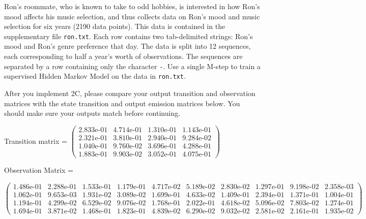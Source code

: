 Ron's roommate, who is known to take to odd hobbies, is interested in how Ron's mood affects his music selection, and thus collects data on Ron's mood and music selection for six years (2190 data points). This data is contained in the supplementary file \texttt{ron.txt}. Each row contains two tab-delimited strings: Ron's mood and Ron's genre preference that day. The data is split into 12 sequences, each corresponding to half a year's worth of observations. The sequences are separated by a row containing only the character \texttt{-}.
\noindent\problem[10] %
Use a single M-step to train a supervised Hidden Markov Model on the data in \texttt{ron.txt}.

After you implement 2C, please compare your output transition and observation matrices with the state transition and output emission matrices below. You should make sure your outputs match before continuing.

Transition matrix = \small $\begin{pmatrix}
    2.833\text{e-}01 & 4.714\text{e-}01 & 1.310\text{e-}01 & 1.143\text{e-}01 \\
    2.321\text{e-}01 & 3.810\text{e-}01 & 2.940\text{e-}01 & 9.284\text{e-}02 \\
    1.040\text{e-}01 & 9.760\text{e-}02 & 3.696\text{e-}01 & 4.288\text{e-}01 \\
    1.883\text{e-}01 & 9.903\text{e-}02 & 3.052\text{e-}01 & 4.075\text{e-}01 
\end{pmatrix}$
\normalsize

Observation Matrix =

\small
$\begin{pmatrix}
1.486\text{e-}01 & 2.288\text{e-}01 & 1.533\text{e-}01 & 1.179\text{e-}01 & 4.717\text{e-}02 & 5.189\text{e-}02 & 2.830\text{e-}02 & 1.297\text{e-}01 & 9.198\text{e-}02 & 2.358\text{e-}03 \\
1.062\text{e-}01 & 9.653\text{e-}03 & 1.931\text{e-}02 & 3.089\text{e-}02 & 1.699\text{e-}01 & 4.633\text{e-}02 & 1.409\text{e-}01 & 2.394\text{e-}01 & 1.371\text{e-}01 & 1.004\text{e-}01 \\
1.194\text{e-}01 & 4.299\text{e-}02 & 6.529\text{e-}02 & 9.076\text{e-}02 & 1.768\text{e-}01 & 2.022\text{e-}01 & 4.618\text{e-}02 & 5.096\text{e-}02 & 7.803\text{e-}02 & 1.274\text{e-}01 \\
1.694\text{e-}01 & 3.871\text{e-}02 & 1.468\text{e-}01 & 1.823\text{e-}01 & 4.839\text{e-}02 & 6.290\text{e-}02 & 9.032\text{e-}02 & 2.581\text{e-}02 & 2.161\text{e-}01 & 1.935\text{e-}02 
\end{pmatrix}$
\normalsize
\medskip

